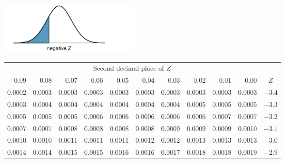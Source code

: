 \begin{table}[p]
\begin{center}{\small
\includegraphics[width=71mm]{extraTeX/appendix/figures/normalTails/normalTailLeft} \vspace{2mm} \\
\begin{tabular}{| rrrrr | rrrrr | c}
  \cline{1-10}
&&& \multicolumn{4}{c}{Second decimal place of $Z$} &&& \\
  \cline{1-10}
0.09 &  0.08 &  0.07 &  0.06 &  0.05 &  0.04 &  0.03 &  0.02 &  0.01 &  0.00 & $Z$  \\
  \hline
  \hline
\scriptsize{0.0002} & \scriptsize{0.0003} & \scriptsize{0.0003} & \scriptsize{0.0003} & \scriptsize{0.0003} & \scriptsize{0.0003} & \scriptsize{0.0003} & \scriptsize{0.0003} & \scriptsize{0.0003} & \scriptsize{0.0003} & $-3.4$ \\
  \scriptsize{0.0003} & \scriptsize{0.0004} & \scriptsize{0.0004} & \scriptsize{0.0004} & \scriptsize{0.0004} & \scriptsize{0.0004} & \scriptsize{0.0004} & \scriptsize{0.0005} & \scriptsize{0.0005} & \scriptsize{0.0005} & $-3.3$ \\
  \scriptsize{0.0005} & \scriptsize{0.0005} & \scriptsize{0.0005} & \scriptsize{0.0006} & \scriptsize{0.0006} & \scriptsize{0.0006} & \scriptsize{0.0006} & \scriptsize{0.0006} & \scriptsize{0.0007} & \scriptsize{0.0007} & $-3.2$ \\
  \scriptsize{0.0007} & \scriptsize{0.0007} & \scriptsize{0.0008} & \scriptsize{0.0008} & \scriptsize{0.0008} & \scriptsize{0.0008} & \scriptsize{0.0009} & \scriptsize{0.0009} & \scriptsize{0.0009} & \scriptsize{0.0010} & $-3.1$ \\
  \scriptsize{0.0010} & \scriptsize{0.0010} & \scriptsize{0.0011} & \scriptsize{0.0011} & \scriptsize{0.0011} & \scriptsize{0.0012} & \scriptsize{0.0012} & \scriptsize{0.0013} & \scriptsize{0.0013} & \scriptsize{0.0013} & $-3.0$ \\
    \hline
    \hline
  \scriptsize{0.0014} & \scriptsize{0.0014} & \scriptsize{0.0015} & \scriptsize{0.0015} & \scriptsize{0.0016} & \scriptsize{0.0016} & \scriptsize{0.0017} & \scriptsize{0.0018} & \scriptsize{0.0018} & \scriptsize{0.0019} & $-2.9$ \\

\end{tabular}}
\end{center}
\end{table}

